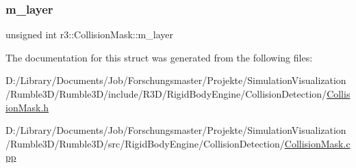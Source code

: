 \mbox{\label{structr3_1_1_collision_mask_a4e3ed2227bb1782f7c6dc948a8427620}} 
\subsubsection{\texorpdfstring{m\+\_\+layer}{m\_layer}}
{\footnotesize\ttfamily unsigned int r3\+::\+Collision\+Mask\+::m\+\_\+layer}



The documentation for this struct was generated from the following files\+:\begin{DoxyCompactItemize}
\item 
D\+:/\+Library/\+Documents/\+Job/\+Forschungsmaster/\+Projekte/\+Simulation\+Visualization/\+Rumble3\+D/\+Rumble3\+D/include/\+R3\+D/\+Rigid\+Body\+Engine/\+Collision\+Detection/\mbox{\hyperlink{_collision_mask_8h}{Collision\+Mask.\+h}}\item 
D\+:/\+Library/\+Documents/\+Job/\+Forschungsmaster/\+Projekte/\+Simulation\+Visualization/\+Rumble3\+D/\+Rumble3\+D/src/\+Rigid\+Body\+Engine/\+Collision\+Detection/\mbox{\hyperlink{_collision_mask_8cpp}{Collision\+Mask.\+cpp}}\end{DoxyCompactItemize}
